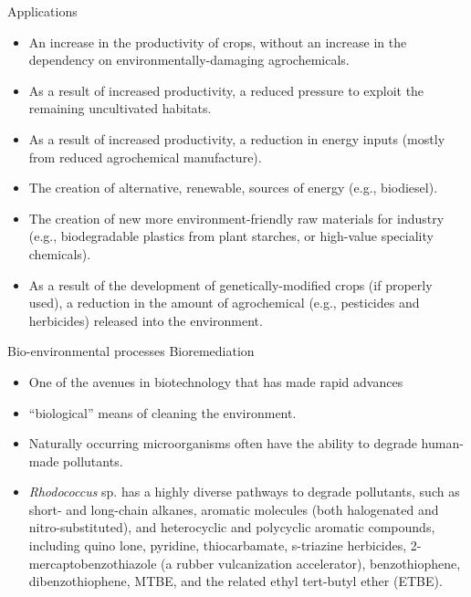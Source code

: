 \documentclass[
  ignorenonframetext,
  aspectratio=169]{beamer}
\providecommand{\tightlist}{%
  \setlength{\itemsep}{0pt}\setlength{\parskip}{0pt}}
\begin{document}
\begin{frame}{Applications}
\protect\hypertarget{applications}{}
\begin{itemize}
\tightlist
\item
  An increase in the productivity of crops, without an increase in the
  dependency on environmentally-damaging agrochemicals.
\item
  As a result of increased productivity, a reduced pressure to exploit
  the remaining uncultivated habitats.
\item
  As a result of increased productivity, a reduction in energy inputs
  (mostly from reduced agrochemical manufacture).
\item
  The creation of alternative, renewable, sources of energy (e.g.,
  biodiesel).
\item
  The creation of new more environment-friendly raw materials for
  industry (e.g., biodegradable plastics from plant starches, or
  high-value speciality chemicals).
\item
  As a result of the development of genetically-modified crops (if
  properly used), a reduction in the amount of agrochemical (e.g.,
  pesticides and herbicides) released into the environment.
\end{itemize}
\end{frame}

\begin{frame}{Bio-environmental processes}
\protect\hypertarget{bio-environmental-processes}{}
\alert{Bioremediation}

\begin{itemize}
\tightlist
\item
  One of the avenues in biotechnology that has made rapid advances
\item
  ``biological'' means of cleaning the environment.
\item
  Naturally occurring microorganisms often have the ability to degrade
  human-made pollutants.
\item
  \emph{Rhodococcus} sp. has a highly diverse pathways to degrade
  pollutants, such as short- and long-chain alkanes, aromatic molecules
  (both halogenated and nitro-substituted), and heterocyclic and
  polycyclic aromatic compounds, including quino lone, pyridine,
  thiocarbamate, s-triazine herbicides, 2-mercaptobenzothiazole (a
  rubber vulcanization accelerator), benzothiophene, dibenzothiophene,
  MTBE, and the related ethyl tert-butyl ether (ETBE).
\end{itemize}
\end{frame}
\end{document}
